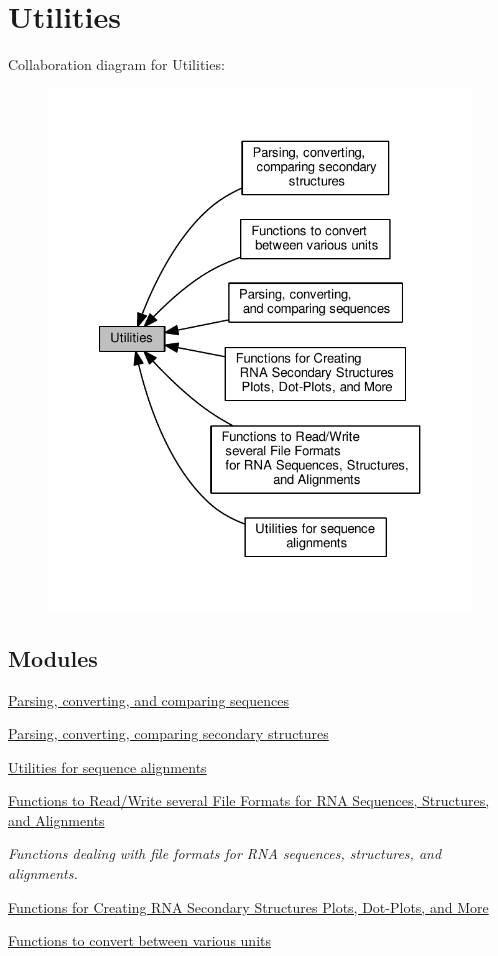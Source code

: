 \hypertarget{group__utils}{}\section{Utilities}
\label{group__utils}
Collaboration diagram for Utilities\+:
\nopagebreak
\begin{figure}[H]
\begin{center}
\leavevmode
\includegraphics[width=327pt]{group__utils}
\end{center}
\end{figure}
\subsection*{Modules}
\begin{DoxyCompactItemize}
\item 
\hyperlink{group__string__utils}{Parsing, converting, and comparing sequences}
\item 
\hyperlink{group__struct__utils}{Parsing, converting, comparing secondary structures}
\item 
\hyperlink{group__aln__utils}{Utilities for sequence alignments}
\item 
\hyperlink{group__file__utils}{Functions to Read/\+Write several File Formats for R\+N\+A Sequences, Structures, and Alignments}
\begin{DoxyCompactList}\small\item\em Functions dealing with file formats for R\+NA sequences, structures, and alignments. \end{DoxyCompactList}\item 
\hyperlink{group__plotting__utils}{Functions for Creating R\+N\+A Secondary Structures Plots, Dot-\/\+Plots, and More}
\item 
\hyperlink{group__units}{Functions to convert between various units}
\end{DoxyCompactItemize}
